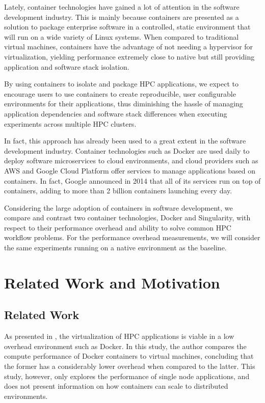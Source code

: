 \documentclass[12pt]{article}
\begin{document}
Lately, container technologies have gained a lot of attention in the
software development industry. This is mainly because containers are
presented as a solution to package enterprise software in a
controlled, static environment that will run on a wide variety of
Linux systems. When compared to traditional virtual machines,
containers have the advantage of not needing a hypervisor for
virtualization, yielding performance extremely close to native but
still providing application and software stack isolation.

By using containers to isolate and package HPC applications, we expect
to encourage users to use containers to create reproducible, user
configurable environments for their applications, thus diminishing the
hassle of managing application dependencies and software stack
differences when executing experiments across multiple HPC clusters.

In fact, this approach has already been used to a great extent in the
software development industry. Container technologies such as Docker
are used daily to deploy software microservices to cloud environments,
and cloud providers such as AWS and Google Cloud Platform offer
services to manage applications based on containers. In fact, Google
announced in 2014 that all of its services run on top of containers,
adding to more than 2 billion containers launching every day.

Considering the large adoption of containers in software development,
we compare and contrast two container technologies, Docker and
Singularity, with respect to their performance overhead and ability to
solve common HPC workflow problems. For the performance overhead
measurements, we will consider the same experiments running on a
native environment as the baseline.

\section{Related Work and Motivation} \label{sec.relatedwork}
\subsection{Related Work}
As presented in \cite{7562612}, the virtualization of HPC applications
is viable in a low overhead environment such as Docker. In this study,
the author compares the compute performance of Docker containers to
virtual machines, concluding that the former has a considerably lower
overhead when compared to the latter. This study, however, only
explores the performance of single node applications, and does not
present information on how containers can scale to distributed
environments.
\end{document}
